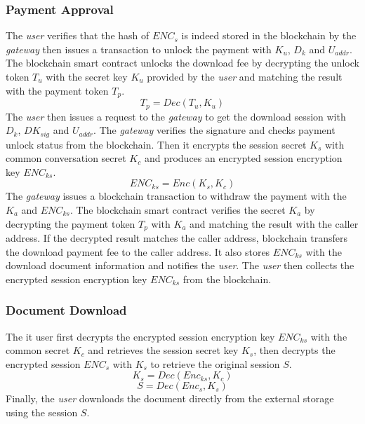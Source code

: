 \subsubsection{Payment Approval}
The {\it user} verifies that the hash of $ENC_s$ is indeed stored in the blockchain by the {\it gateway} then issues a transaction to unlock the payment with $K_u$, $D_k$ and $U_{addr}$. The blockchain smart contract unlocks the download fee by decrypting the unlock token $T_u$ with the secret key $K_u$ provided by the {\it user} and matching the result with the payment token $T_p$. 
\begin{equation}
\label{eq-d-6} 
T_p = Dec (T_u, K_u)
\end{equation}
The {\it user} then issues a request to the {\it gateway} to get the download session with $D_k$, $DK_{sig}$ and $U_{addr}$. The {\it gateway} verifies the signature and checks payment unlock status from the  blockchain. Then it encrypts the session secret $K_s$ with common conversation secret $K_c$ and produces an encrypted session encryption key $ENC_{ks}$.
\begin{equation}
\label{eq-d-7} 
ENC_{ks} = Enc (K_s, K_c)
\end{equation}
The {\it gateway} issues a blockchain transaction to withdraw the payment with the $K_a$ and $ENC_{ks}$. The blockchain smart contract verifies the secret $K_a$ by decrypting the payment token $T_p$ with $K_a$ and matching the result with the caller address. If the decrypted result matches the caller address, blockchain transfers the download payment fee to the caller address. It also stores $ENC_{ks}$ with the download document information and notifies the {\it user}. The {\it user} then collects the encrypted session encryption key $ENC_{ks}$ from the blockchain.

\subsubsection{Document Download}
The {it user} first decrypts the encrypted session encryption key $ENC_{ks}$ with the common secret $K_c$ and retrieves the session secret key $K_s$, then decrypts the encrypted session $ENC_s$ with $K_s$ to retrieve the original session $S$.
\begin{equation}
\label{eq-d-8} 
K_s = Dec (Enc_{ks}, K_c)
\end{equation}
\begin{equation}
\label{eq-d-9} 
S = Dec (Enc_s, K_s)
\end{equation}
Finally, the {\it user} downloads the document directly from the external storage using the session $S$.

